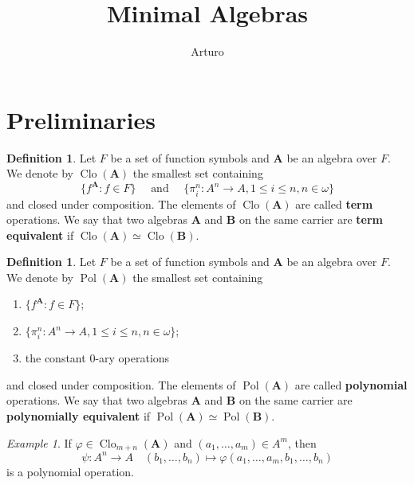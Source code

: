 \documentclass{amsart}
\theoremstyle{plain}
\theoremstyle{definition}
\newtheorem{definition}[theorem]{Definition}
\theoremstyle{remark}
\newtheorem{example}[theorem]{Example}
\def\phi{\varphi}
\DeclareMathOperator{\Clo}{Clo}
\DeclareMathOperator{\Pol}{Pol}
\begin{document}
\title{Minimal Algebras}
\author{Arturo}


  

\maketitle 

\section{Preliminaries} 
\begin{definition}
    Let $F$ be a set of function symbols and $\mathbf{A}$ be an algebra over $F$. 
    We denote by $\Clo(\mathbf{A})$ the smallest set containing 
    \begin{equation*}
        \{f^\mathbf{A}: f \in F\} \quad \text{ and } \quad \{\pi^n_i: A^n \to A, 1 \le i \le n, n \in \omega\}
    \end{equation*}
and closed under composition. 
The elements of $\Clo(\mathbf{A})$ are called \textbf{term} operations. 
We say that two algebras $\mathbf{A}$ and $\mathbf{B}$ on the same carrier are \textbf{term equivalent} if $\Clo(\mathbf{A}) \simeq \Clo(\mathbf{B})$. 
\end{definition}

\begin{definition}
    Let $F$ be a set of function symbols and $\mathbf{A}$ be an algebra over $F$. 
    We denote by $\Pol(\mathbf{A})$ the smallest set containing 
    \begin{enumerate}
        \item $\{f^\mathbf{A}: f \in F\}$; 
        \item $\{\pi^n_i: A^n \to A, 1 \le i \le n, n \in \omega\}$; 
        \item the constant $0$-ary operations
    \end{enumerate}
and closed under composition. 
The elements of $\Pol(\mathbf{A})$ are called \textbf{polynomial} operations. 
We say that two algebras $\mathbf{A}$ and $\mathbf{B}$ on the same carrier are \textbf{polynomially equivalent} if $\Pol(\mathbf{A}) \simeq \Pol(\mathbf{B})$. 
\end{definition}

\begin{example}
    If $\phi \in \Clo_{m+n}(\mathbf{A})$ and $(a_1, \ldots, a_m) \in A^m$, then 
    \begin{equation*}
        \psi: A^n \to A \quad (b_1, \ldots, b_n) \mapsto \phi(a_1, \ldots, a_m,b_1, \ldots, b_n)
    \end{equation*}
is a polynomial operation.  
\end{example}
\end{document}
